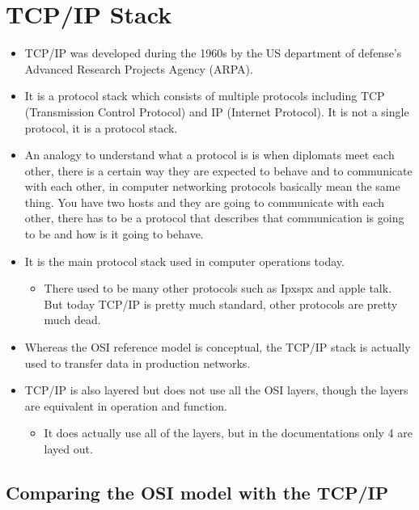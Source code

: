 \section{TCP/IP Stack}
\begin{itemize}
    \item TCP/IP was developed during the 1960s by the US department of defense's Advanced Research Projects Agency (ARPA).
    \item It is a protocol stack which consists of multiple protocols including TCP (Transmission Control Protocol) and IP (Internet Protocol). It is not a single protocol, it is a protocol stack.
    \item An analogy to understand what a protocol is is when diplomats meet each other, there is a certain way they are expected to behave and to communicate with each other, in computer networking protocols basically mean the same thing. You have two hosts and they are going to communicate with each other, there has to be a protocol that describes that communication is going to be and how is it going to behave.
    \item It is the main protocol stack used in computer operations today.
        \begin{itemize}
            \item There used to be many other protocols such as Ipxspx and apple talk. But today TCP/IP is pretty much standard, other protocols are pretty much dead.
        \end{itemize}
    \item Whereas the OSI reference model is conceptual, the TCP/IP stack is actually used to transfer data in production networks.
    \item TCP/IP is also layered but does not use all the OSI layers, though the layers are equivalent in operation and function.
        \begin{itemize}
            \item It does actually use all of the layers, but in the documentations only 4 are layed out.
        \end{itemize}
\end{itemize}

\subsection{Comparing the OSI model with the TCP/IP}

